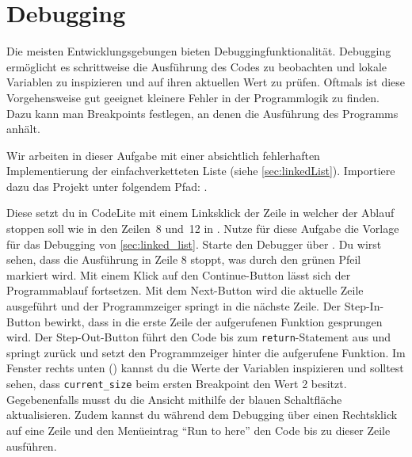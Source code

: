 \section{\ExercisePrefixMemory Debugging \optional}\label{sec:debugging}
\optionaltextboxCPP

Die meisten Entwicklungsgebungen bieten Debuggingfunktionalität.
Debugging ermöglicht es schrittweise die Ausführung des Codes zu beobachten und lokale Variablen zu inspizieren und auf ihren aktuellen Wert zu prüfen. Oftmals ist diese Vorgehensweise gut geeignet kleinere Fehler in der Programmlogik zu finden.
Dazu kann man Breakpoints festlegen, an denen die Ausführung des Programms anhält.

Wir arbeiten in dieser Aufgabe mit einer absichtlich fehlerhaften Implementierung der einfachverketteten Liste (siehe \ref{sec:linkedList}).
Importiere dazu das Projekt unter folgendem Pfad: .

Diese setzt du in CodeLite mit einem Linksklick der Zeile in welcher der Ablauf stoppen soll wie in den Zeilen~8 und~12 in . 
Nutze für diese Aufgabe die Vorlage für das Debugging von \ref{sec:linked_list}. Starte den Debugger über .
Du wirst sehen, dass die Ausführung in Zeile 8 stoppt, was durch den grünen Pfeil markiert wird. 
Mit einem Klick auf den Continue-Button  lässt sich der Programmablauf fortsetzen.
Mit dem Next-Button   wird die aktuelle Zeile ausgeführt und der Programmzeiger springt in die nächste Zeile.
Der Step-In-Button  bewirkt, dass in die erste Zeile der aufgerufenen Funktion gesprungen wird.
Der Step-Out-Button   führt den Code bis zum \lstinline|return|-Statement aus und springt zurück und setzt den Programmzeiger hinter die aufgerufene Funktion.
Im Fenster rechts unten () kannst du die Werte der Variablen inspizieren und solltest sehen, dass \lstinline|current_size| beim ersten Breakpoint den Wert 2 besitzt.
Gegebenenfalls musst du die Ansicht mithilfe der blauen Schaltfläche  aktualisieren.
Zudem kannst du während dem Debugging über einen Rechtsklick auf eine Zeile und den Menüeintrag \enquote{Run to here} den Code bis zu dieser Zeile ausführen.
 
 

